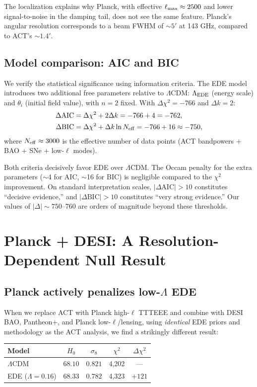 \documentclass[twocolumn,showpacs,preprintnumbers,amsmath,amssymb,prd]{revtex4-2}
\newcommand{\lcdm}{$\Lambda$CDM}
\begin{document}
The localization explains why Planck, with effective $\ell_{\rm max} 
\approx 2500$ and lower signal-to-noise in the damping tail, does not see 
the same feature. Planck's angular resolution corresponds to a beam FWHM 
of $\sim 5'$ at 143 GHz, compared to ACT's $\sim 1.4'$.

\subsection{Model comparison: AIC and BIC}
\label{sec:aic_bic}

We verify the statistical significance using information criteria. The 
EDE model introduces two additional free parameters relative to \lcdm: 
$\Lambda_{\rm EDE}$ (energy scale) and $\theta_i$ (initial field value), 
with $n = 2$ fixed. With $\Delta\chi^2 = -766$ and $\Delta k = 2$:
\begin{align}
\Delta\text{AIC} &= \Delta\chi^2 + 2\Delta k = -766 + 4 = -762, \\
\Delta\text{BIC} &= \Delta\chi^2 + \Delta k \ln N_{\rm eff} = -766 + 16 \approx -750,
\end{align}
where $N_{\rm eff} \approx 3000$ is the effective number of data points 
(ACT bandpowers + BAO + SNe + low-$\ell$ modes).

Both criteria decisively favor EDE over \lcdm. The Occam penalty for the 
extra parameters ($\sim$4 for AIC, $\sim$16 for BIC) is negligible compared 
to the $\chi^2$ improvement. On standard interpretation scales, 
$|\Delta\text{AIC}| > 10$ constitutes ``decisive evidence,'' and 
$|\Delta\text{BIC}| > 10$ constitutes ``very strong evidence.'' Our 
values of $|\Delta| \sim 750$--$760$ are orders of magnitude beyond 
these thresholds.

\section{Planck + DESI: A Resolution-Dependent Null Result}
\label{sec:planck}

\subsection{Planck actively penalizes low-$\Lambda$ EDE}

When we replace ACT with Planck high-$\ell$ TTTEEE and combine with DESI BAO, 
Pantheon+, and Planck low-$\ell$/lensing, using \emph{identical} EDE priors 
and methodology as the ACT analysis, we find a strikingly different result:
\begin{center}
\begin{tabular}{lcccc}
\toprule
Model & $H_0$ & $\sigma_8$ & $\chi^2$ & $\Delta\chi^2$ \\
\midrule
\lcdm & $68.10$ & $0.821$ & 4,202 & --- \\
EDE ($\Lambda = 0.16$) & $68.33$ & $0.782$ & 4,323 & $+121$ \\
\bottomrule
\end{tabular}
\end{center}
\end{document}
